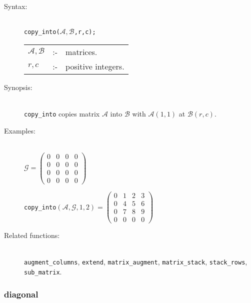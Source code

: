 \begin{description}
\item[Syntax:]\mbox{}\\
\texttt{copy\_into($\mathcal{A,B}$,r,c);}\\[2mm]
\begin{tabular}{l l l}
$\mathcal{A,B}$ &:-& matrices. \\
$r,c$          &:-& positive integers.
\end{tabular}

\item[Synopsis:]\mbox{}\\
\texttt{copy\_into} copies matrix $\mathcal{A}$ into
                $\mathcal{B}$ with $\mathcal{A}(1,1)$ at $\mathcal{B}(r,c)$.

\item[Examples:]\mbox{}\\
  \(\mathcal{G} = \begin{pmatrix} 0 & 0 & 0 & 0 \\ 0 & 0 & 0 & 0 \\
    0 & 0 & 0 & 0 \\ 0 & 0 & 0 & 0 \end{pmatrix}\)

  \texttt{copy\_into}\((\mathcal{A,G},1,2)  =
  \begin{pmatrix} 0 & 1 & 2 & 3 \\ 0 & 4 & 5 & 6 \\ 0 & 7 & 8
    & 9 \\ 0 & 0 & 0 & 0  \end{pmatrix}\)

\item[Related functions:]\mbox{}\\
\texttt{augment\_columns}, \texttt{extend}, \texttt{matrix\_augment},
\texttt{matrix\_stack}, \texttt{stack\_rows}, \texttt{sub\_matrix}.

\end{description}


\subsubsection{diagonal}
\label{linalg:diagonal}
\hypertarget{operator:DIAGONAL}{}

